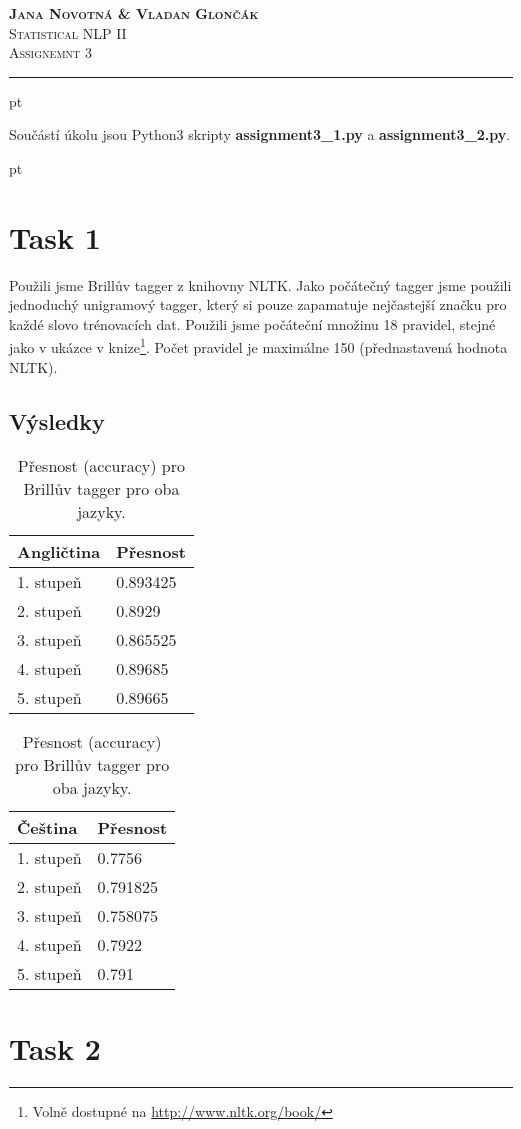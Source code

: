 \documentclass[a4paper, 10.5pt]{article}
\begin{document}
\noindent
\large\textsc{\textbf{Jana Novotná \& Vladan Glončák}}  \\
\normalsize \textsc{Statistical NLP II}\\
\textsc{Assignemnt 3}

\noindent\rule[0.5ex]{\linewidth}{1pt}

\newcommand{\norm}[1]{\left\lVert#1\right\rVert}

 pt

Součástí úkolu jsou Python3 skripty \textbf{assignment3\_1.py} a \textbf{assignment3\_2.py}.

 pt

\section*{Task 1}

Použili jsme Brillův tagger z knihovny NLTK.
Jako počátečný tagger jsme použili jednoduchý unigramový tagger, který si pouze zapamatuje nejčastejší značku pro každé slovo trénovacích dat.
Použili jsme počáteční množinu 18 pravidel, stejné jako v ukázce v knize\footnote{Volně dostupné na \url{http://www.nltk.org/book/}}. Počet pravidel je maximálne 150 (přednastavená hodnota NLTK).

\subsection*{Výsledky}

\vskip 10pt

\begin{table}[H]
\centering
\begin{tabular}{ll}
\toprule
\textbf{Angličtina} & \textbf{Přesnost} \\
\midrule
1. stupeň & 0.893425 \\
2. stupeň & 0.8929   \\
3. stupeň & 0.865525 \\
4. stupeň & 0.89685  \\
5. stupeň & 0.89665  \\
\bottomrule
\end{tabular}
\hskip 50pt
\begin{tabular}{ll}
\toprule
\textbf {Čeština} & \textbf{Přesnost} \\
\midrule
1. stupeň & 0.7756   \\
2. stupeň & 0.791825 \\
3. stupeň & 0.758075 \\
4. stupeň & 0.7922   \\
5. stupeň & 0.791    \\
\bottomrule
\end{tabular}
\caption{Přesnost (accuracy) pro Brillův tagger pro oba jazyky.}
\label{eng_big}
\end{table}

\section*{Task 2}
\end{document}
